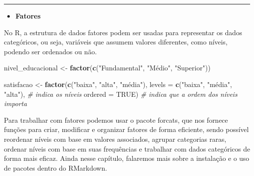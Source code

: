 \documentclass[
]{book}
\newenvironment{Shaded}{\begin{snugshade}}{\end{snugshade}}
\newcommand{\AttributeTok}[1]{\textcolor[rgb]{0.13,0.29,0.53}{#1}}
\newcommand{\CommentTok}[1]{\textcolor[rgb]{0.56,0.35,0.01}{\textit{#1}}}
\newcommand{\ConstantTok}[1]{\textcolor[rgb]{0.56,0.35,0.01}{#1}}
\newcommand{\DecValTok}[1]{\textcolor[rgb]{0.00,0.00,0.81}{#1}}
\newcommand{\FunctionTok}[1]{\textcolor[rgb]{0.13,0.29,0.53}{\textbf{#1}}}
\newcommand{\NormalTok}[1]{#1}
\newcommand{\OtherTok}[1]{\textcolor[rgb]{0.56,0.35,0.01}{#1}}
\newcommand{\SpecialCharTok}[1]{\textcolor[rgb]{0.81,0.36,0.00}{\textbf{#1}}}
\newcommand{\StringTok}[1]{\textcolor[rgb]{0.31,0.60,0.02}{#1}}
\providecommand{\tightlist}{%
  \setlength{\itemsep}{0pt}\setlength{\parskip}{0pt}}
\begin{document}
\begin{Shaded}
\end{Shaded}

\begin{center}\rule{0.5\linewidth}{0.5pt}\end{center}

\begin{itemize}
\tightlist
\item
  \textbf{Fatores}
\end{itemize}

No R, a estrutura de dados fatores podem ser usadas para representar os dados categóricos, ou seja, variáveis que assumem valores diferentes, como níveis, podendo ser ordenados ou não.

\begin{Shaded}
\begin{Highlighting}[]
\NormalTok{nivel\_educacional }\OtherTok{\textless{}{-}} \FunctionTok{factor}\NormalTok{(}\FunctionTok{c}\NormalTok{(}\StringTok{"Fundamental"}\NormalTok{, }\StringTok{"Médio"}\NormalTok{, }\StringTok{"Superior"}\NormalTok{))}

\NormalTok{satisfacao }\OtherTok{\textless{}{-}} \FunctionTok{factor}\NormalTok{(}\FunctionTok{c}\NormalTok{(}\StringTok{"baixa"}\NormalTok{, }\StringTok{"alta"}\NormalTok{, }\StringTok{"média"}\NormalTok{),}
                     \AttributeTok{levels =} \FunctionTok{c}\NormalTok{(}\StringTok{"baixa"}\NormalTok{, }\StringTok{"média"}\NormalTok{, }\StringTok{"alta"}\NormalTok{), }\CommentTok{\# indica os níveis}
                     \AttributeTok{ordered =} \ConstantTok{TRUE}\NormalTok{) }\CommentTok{\# indica que a ordem dos níveis importa}
\end{Highlighting}
\end{Shaded}

Para trabalhar com fatores podemos usar o pacote forcats, que nos fornece funções para criar, modificar e organizar fatores de forma eficiente, sendo possível reordenar níveis com base em valores associados, agrupar categorias raras, ordenar níveis com base em suas frequências e trabalhar com dados categóricos de forma mais eficaz. Ainda nesse capítulo, falaremos mais sobre a instalação e o uso de pacotes dentro do RMarkdown.
\end{document}
